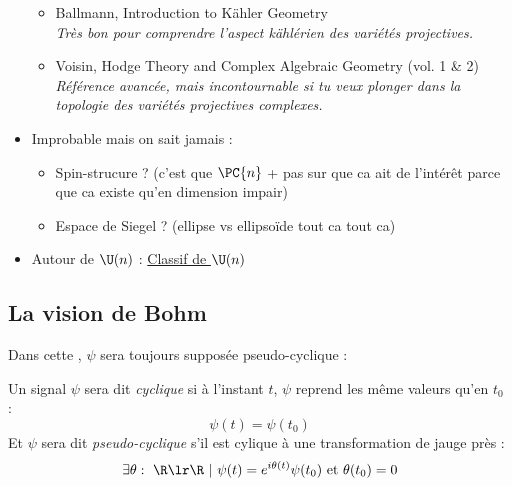 \begin{itemize}
\begin{itemize}
		\item Ballmann, Introduction to Kähler Geometry \\
		\textit{Très bon pour comprendre l’aspect kählérien des variétés projectives.}
		
		\item Voisin, Hodge Theory and Complex Algebraic Geometry (vol. 1 \& 2) \\
		\textit{Référence avancée, mais incontournable si tu veux plonger dans la topologie des variétés projectives complexes.}
	\end{itemize}
	
	\item Improbable mais on sait jamais :
	\begin{itemize}
		\item Spin-strucure ? (c'est que $\PC{n}$ + pas sur que ca ait de l'intérêt parce que ca existe qu'en dimension impair)
		
		\item Espace de Siegel ? (ellipse vs ellipsoïde tout ca tout ca)
	\end{itemize}
	
	\item Autour de $\U(n)$ : \href{https://en.wikipedia.org/wiki/Classifying_space_for_U(n)}{Classif de $\U(n)$}
	
\end{itemize}




\subsection{La vision de Bohm \cite[fig. 4.3]{bohm_geometric_2003}}
\label{subsec:lift_approch}

Dans cette , $\psi$ sera toujours supposée pseudo-cyclique :
\begin{definition}
	Un signal $\psi$ sera dit \emph{cyclique} si à l'instant $t$, $\psi$ reprend les même valeurs qu'en $t_0$ :
	\[\psi(t)=\psi(t_0)\]
	Et $\psi$ sera dit \emph{pseudo-cyclique} s'il est cylique à une transformation de jauge près :
	\[\exists \theta:\ \R\lr\R\ |\ \psi(t) = e^{i\theta(t)}\psi(t_0)\text{ et } \theta(t_0)=0\]
\end{definition}

